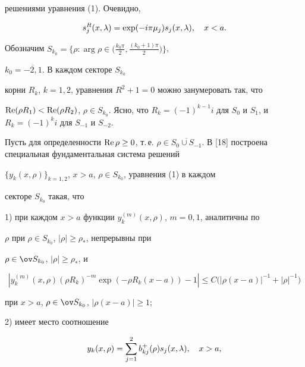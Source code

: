 решениями уравнения (1). Очевидно,


\begin{equation}


s_{j}^R(x,\la)=\exp(-i\pi\mu_j) s_{j}(x,\la),\quad x<a.


\end{equation}





Обозначим $S_{k_0}=\big\{\rho: \arg\rho\in\big(\frac{k_0\pi}{2},


\frac{(k_0+1)\pi}{2}\big)\big\}$,


$k_0=\overline{-2,1}$. В каждом секторе $S_{k_0}$


корни $R_k$, $k=1,2$, уравнения $R^2+1=0$ можно занумеровать так, что


$\re(\rho R_1)<\re(\rho R_2)$, $\rho\in S_{k_0}$. Ясно, что $R_k=


(-1)^{k-1}i$ для $S_0$ и $S_1$, и $R_k=(-1)^{k}i$ для $S_{-1}$ и $S_{-2}$.


Пусть для определенности $\re\rho\ge 0$, т.\,е. $\rho\in\overline{S_0\cup


S_{-1}}$. В [18] построена специальная фундаментальная система решений


$\{y_k(x,\rho)\}_{k=1,2}$, $x>a$, $\rho\in S_{k_0}$, уравнения (1) в каждом


секторе $S_{k_0}$ такая, что





1) при каждом $x>a$ функции $y_k^{(m)}(x,\rho)$, $m=0,1$, аналитичны по


$\rho$ при $\rho\in S_{k_0}$, $|\rho|\ge\rho_{*}$, непрерывны при


$\rho\in\ov S_{k_0}$, $|\rho|\ge\rho_{*}$, и


\begin{equation}


|y_k^{(m)}(x,\rho)(\rho R_k)^{-m}\exp(-\rho R_k(x-a))-1|


\le C\big(|\rho(x-a)|^{-1}+|\rho|^{-1}\big)


\end{equation}


при $x>a$, $\rho\in\ov S_{k_0}$, $|\rho(x-a)|\ge 1$;





2) имеет место соотношение


\begin{equation}


y_k(x,\rho)=\sum_{j=1}^{2} b_{kj}^{+}(\rho)s_j(x,\la),\quad x>a,


\end{equation}


